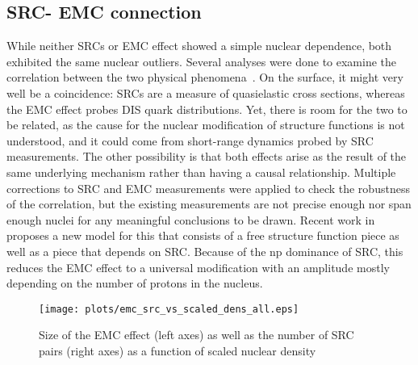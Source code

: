 \subsection{\label{sec:SRC_EMC}SRC- EMC connection}
While neither SRCs or EMC effect showed a simple nuclear dependence, both exhibited the same nuclear outliers. Several analyses were done to examine the correlation between the two physical phenomena~\cite{PhysRevC.86.065204, Hen:2012fm, Weinstein:2010rt}.  On the surface, it might very well be a coincidence: SRCs are a measure of quasielastic cross sections, whereas the EMC effect probes DIS quark distributions.  Yet, there is room for the two to be related, as the cause for the nuclear modification of structure functions is not understood, and it could come from short-range dynamics probed by SRC measurements.   The other possibility is that both effects arise as the result of the same underlying mechanism rather than having a causal relationship.  Multiple corrections to SRC and EMC measurements were applied to check the robustness of the correlation, but the existing measurements are not precise enough nor span enough nuclei for any meaningful conclusions to be drawn.  Recent work in %
proposes a new model for this that consists of a free structure function piece as well as a piece that depends on SRC. Because of the np dominance of SRC, this reduces the EMC effect to a universal modification with an amplitude mostly depending on the number of protons in the nucleus. %
\begin{figure}[htb]
  \texttt{[image: plots/emc\_src\_vs\_scaled\_dens\_all.eps]}
  \caption{Size of the EMC effect (left axes) as well as the number of SRC pairs (right axes) as a function of scaled nuclear density}
  \label{fig:src_emc}
\end{figure}

